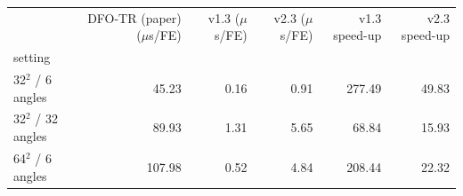 \begin{tabular}{lrrrrr}
\toprule
 & DFO-TR (paper) ($\mu$s/FE) & v1.3 ($\mu$s/FE) & v2.3 ($\mu$s/FE) & v1.3 speed-up & v2.3 speed-up \\
setting &  &  &  &  &  \\
\midrule
32$^2$ / 6 angles & 45.23 & 0.16 & 0.91 & 277.49 & 49.83 \\
32$^2$ / 32 angles & 89.93 & 1.31 & 5.65 & 68.84 & 15.93 \\
64$^2$ / 6 angles & 107.98 & 0.52 & 4.84 & 208.44 & 22.32 \\
\bottomrule
\end{tabular}
